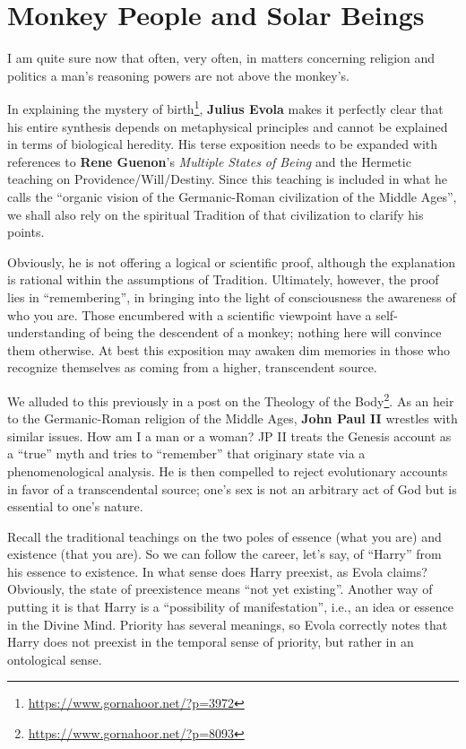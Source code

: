 \section{Monkey People and Solar Beings}

\begin{quotex}
I am quite sure now that often, very often, in matters concerning religion and politics a man's reasoning powers are not above the monkey's.
\end{quotex}


\hfill\break

In explaining the mystery of birth\footnote{\url{https://www.gornahoor.net/?p=3972}}, \textbf{Julius Evola} makes it perfectly clear that his entire synthesis depends on metaphysical principles and cannot be explained in terms of biological heredity. His terse exposition needs to be expanded with references to \textbf{Rene Guenon}'s \emph{Multiple States of Being} and the Hermetic teaching on Providence/Will/Destiny. Since this teaching is included in what he calls the ``organic vision of the Germanic-Roman civilization of the Middle Ages'', we shall also rely on the spiritual Tradition of that civilization to clarify his points.

Obviously, he is not offering a logical or scientific proof, although the explanation is rational within the assumptions of Tradition. Ultimately, however, the proof lies in ``remembering'', in bringing into the light of consciousness the awareness of who you are. Those encumbered with a scientific viewpoint have a self-understanding of being the descendent of a monkey; nothing here will convince them otherwise. At best this exposition may awaken dim memories in those who recognize themselves as coming from a higher, transcendent source.

We alluded to this previously in a post on the Theology of the Body\footnote{\url{https://www.gornahoor.net/?p=8093}}. As an heir to the Germanic-Roman religion of the Middle Ages, \textbf{John Paul II} wrestles with similar issues. How am I a man or a woman? JP II treats the Genesis account as a ``true'' myth and tries to ``remember'' that originary state via a phenomenological analysis. He is then compelled to reject evolutionary accounts in favor of a transcendental source; one's sex is not an arbitrary act of God but is essential to one's nature.

Recall the traditional teachings on the two poles of essence (what you are) and existence (that you are). So we can follow the career, let's say, of ``Harry'' from his essence to existence. In what sense does Harry preexist, as Evola claims? Obviously, the state of preexistence means ``not yet existing''. Another way of putting it is that Harry is a ``possibility of manifestation'', i.e., an idea or essence in the Divine Mind. Priority has several meanings, so Evola correctly notes that Harry does not preexist in the temporal sense of priority, but rather in an ontological sense.

